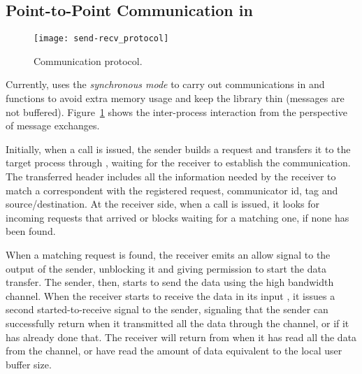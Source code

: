 \subsection{Point-to-Point Communication in \lwmpi}
\label{sec:lwbmpi-sendrecv}

	\begin{figure}[t]
		\centering
		\texttt{[image: send-recv\_protocol]}
		\caption{Communication protocol.}
		\label{figure:comm-protocol}
		\vspace{-10pt}
	\end{figure}

	Currently, \lwmpi uses the \textit{synchronous mode} to carry out
	communications in \mpisend and \mpirecv functions
	to avoid extra memory usage and keep the library thin (\ie messages
	are not buffered). Figure~\ref{figure:comm-protocol} shows the
	inter-process interaction from the perspective of message exchanges.

	Initially, when a \mpisend call is issued, the
	sender builds a request and transfers it to the target process
	through \mailbox, waiting for the receiver to establish the communication.
	The transferred header includes all the information needed by the receiver
	to match a correspondent \mpirecv with the registered request, \ie
	communicator id, tag and source/destination.
	At the receiver side, when a \mpirecv call is issued, it looks for
	incoming requests that arrived or blocks waiting for a matching
	one, if none has been found.

	When a matching request is found, the receiver emits an allow signal
	to the output \portal of the sender, unblocking it and giving permission
	to start the data transfer. The sender, then, starts to send the data
	using the high bandwidth channel. When the receiver starts to receive the
	data in its input \portal, it issues a second started-to-receive signal
	to the sender, signaling that the sender can successfully return when it
	transmitted all the data through the channel, or if it has already done that.
	The receiver will return from \mpirecv when it has
	read all the data from the channel, or have read the amount of data
	equivalent to the local user buffer size. 
